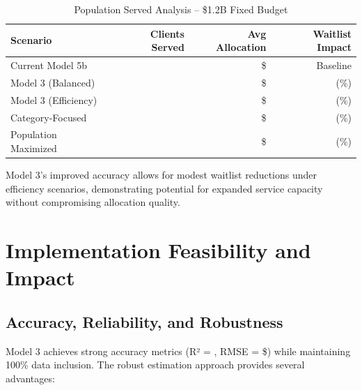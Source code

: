 \begin{table}[h]
\centering
\caption{Population Served Analysis -- \$1.2B Fixed Budget}
\begin{tabular}{lrrr}
\toprule
\textbf{Scenario} & \textbf{Clients Served} & \textbf{Avg Allocation} & \textbf{Waitlist Impact} \\
\midrule
Current Model 5b & \ModelThreePopcurrentbaselineClients{} & \$\ModelThreePopcurrentbaselineAvgAlloc{} & Baseline \\
Model 3 (Balanced) & \ModelThreePopmodelbalancedClients{} & \$\ModelThreePopmodelbalancedAvgAlloc{} & \ModelThreePopmodelbalancedWaitlistChange{} (\ModelThreePopmodelbalancedWaitlistPct{}\%) \\
Model 3 (Efficiency) & \ModelThreePopmodelefficiencyClients{} & \$\ModelThreePopmodelefficiencyAvgAlloc{} & \ModelThreePopmodelefficiencyWaitlistChange{} (\ModelThreePopmodelefficiencyWaitlistPct{}\%) \\
Category-Focused & \ModelThreePopcategoryfocusedClients{} & \$\ModelThreePopcategoryfocusedAvgAlloc{} & \ModelThreePopcategoryfocusedWaitlistChange{} (\ModelThreePopcategoryfocusedWaitlistPct{}\%) \\
Population Maximized & \ModelThreePoppopulationmaximizedClients{} & \$\ModelThreePoppopulationmaximizedAvgAlloc{} & \ModelThreePoppopulationmaximizedWaitlistChange{} (\ModelThreePoppopulationmaximizedWaitlistPct{}\%) \\
\bottomrule
\end{tabular}
\end{table}

Model 3's improved accuracy allows for modest waitlist reductions under efficiency scenarios, demonstrating potential for expanded service capacity without compromising allocation quality.

\section{Implementation Feasibility and Impact}

\subsection{Accuracy, Reliability, and Robustness}

Model 3 achieves strong accuracy metrics (R² = \ModelThreeRSquaredTest{}, RMSE = \$\ModelThreeRMSETest{}) while maintaining 100\% data inclusion. The robust estimation approach provides several advantages:

